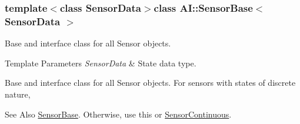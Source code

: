\subsubsection*{template$<$class Sensor\-Data$>$class A\-I\-::\-Sensor\-Base$<$ Sensor\-Data $>$}

Base and interface class for all Sensor objects. 


\begin{DoxyTemplParams}{Template Parameters}
{\em Sensor\-Data} & State data type.\\
\hline
\end{DoxyTemplParams}
Base and interface class for all Sensor objects. For sensors with states of discrete nature, \begin{DoxySeeAlso}{See Also}
\hyperlink{classAI_1_1SensorBase}{Sensor\-Base}. Otherwise, use this or \hyperlink{namespaceAI_a7ceaa7caf6e3bf156b8d2ab429d981b8}{Sensor\-Continuous}. 
\end{DoxySeeAlso}


